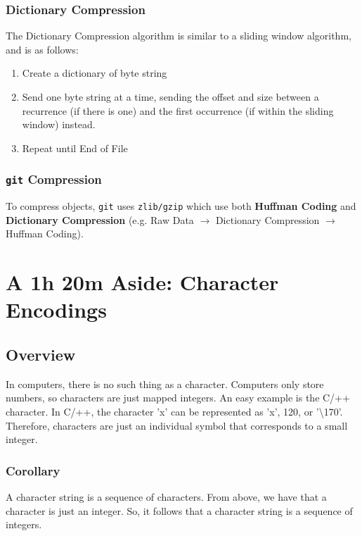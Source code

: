 \documentclass[13pt]{article}
\begin{document}
\subsubsection{Dictionary Compression}
The Dictionary Compression algorithm is similar to a sliding window algorithm, and is as follows:
\begin{enumerate}[label=(\arabic*)]
\item Create a dictionary of byte string
\item Send one byte string at a time, sending the offset and size between a recurrence (if there is one) and the first occurrence (if within the sliding window) instead.
\item Repeat until End of File
\end{enumerate}

\subsubsection{\texttt{git} Compression}
To compress objects, \texttt{git} uses \texttt{zlib/gzip} which use both \textbf{Huffman Coding} and \textbf{Dictionary Compression} (e.g. Raw Data $\rightarrow$ Dictionary Compression $\rightarrow$ Huffman Coding).





\section{A 1h 20m Aside: Character Encodings}

\subsection{Overview}
In computers, there is no such thing as a character. Computers only store numbers, so characters are just mapped integers. An easy example is the C/++ character. In C/++, the character 'x' can be represented as 'x', 120, or '\textbackslash170'. Therefore, characters are just an individual symbol that corresponds to a small integer.

\subsubsection*{Corollary}
A character string is a sequence of characters. From above, we have that a character is just an integer. So, it follows that a character string is a sequence of integers.
\end{document}

